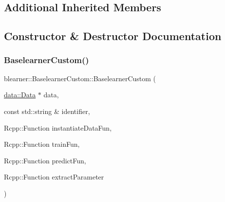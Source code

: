 \subsection*{Additional Inherited Members}


\subsection{Constructor \& Destructor Documentation}
\mbox{\label{classblearner_1_1_baselearner_custom_ac812a6b0d79f75560caa91ec101ca6e3}} 
\subsubsection{\texorpdfstring{Baselearner\+Custom()}{BaselearnerCustom()}}
{\footnotesize\ttfamily blearner\+::\+Baselearner\+Custom\+::\+Baselearner\+Custom (\begin{DoxyParamCaption}\item[{\hyperlink{classdata_1_1_data}{data\+::\+Data} $\ast$}]{data,  }\item[{const std\+::string \&}]{identifier,  }\item[{Rcpp\+::\+Function}]{instantiate\+Data\+Fun,  }\item[{Rcpp\+::\+Function}]{train\+Fun,  }\item[{Rcpp\+::\+Function}]{predict\+Fun,  }\item[{Rcpp\+::\+Function}]{extract\+Parameter }\end{DoxyParamCaption})}


